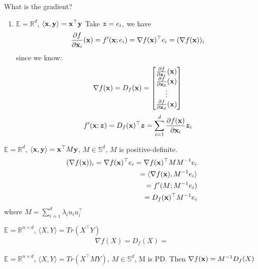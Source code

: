 \documentclass[11pt]{article}
\begin{document}
\begin{remark}
    What is the gradient?
    \begin{enumerate}
        \item $\mathbb{E} = \mathbb{R}^{d}$, $\langle {\mathbf{x}}, {\mathbf{y}} \rangle = {\mathbf{x}}^{\top}{\mathbf{y}}$
        Take ${\bm{z}} = e_{i}$, we have 
        \begin{align*}
            \frac{\partial f}{\partial {\mathbf{x}}_{i}}({\mathbf{x}}) = f'({\mathbf{x}};e_{i}) = \nabla f({\mathbf{x}})^{\top}e_i
                =(\nabla f({\mathbf{x}}))_{i}
        \end{align*}
        since we know:
        \begin{align*}
            \nabla f({\mathbf{x}}) = D_{f}({\mathbf{x}}) = \begin{bmatrix} \frac{\partial f}{\partial {\mathbf{x}}_1}({\mathbf{x}}) \\ 
                \frac{\partial f}{\partial {\mathbf{x}}_2}({\mathbf{x}}) \\ \vdots 
                \\ 
                \frac{\partial f}{\partial {\mathbf{x}}_d}({\mathbf{x}})
             \end{bmatrix}
        \end{align*}
        \begin{align*}
            f'({\mathbf{x}}; {\bm{z}}) = D_{f}({\mathbf{x}})^{\top}{\bm{z}} = \sum_{i=1}^{d}\frac{\partial f({\mathbf{x}})}{\partial {\mathbf{x}}_{i}}{\bm{z}}_{i}
        \end{align*}
    \end{enumerate}
    \item $\mathbb{E} = \mathbb{R}^{d}$, $\langle {\mathbf{x}},{\mathbf{y}} \rangle = {\mathbf{x}}^{\top}M{\mathbf{y}}$, 
    $M \in \mathbb{S}^{d}$, $M$ is positive-definite.
    \begin{align*}
        (\nabla f({\mathbf{x}}))_{i} = \nabla f({\mathbf{x}})^{\top}e_{i} = \nabla f({\mathbf{x}})^{\top}MM^{-1}e_{i}\\
        = \langle \nabla f({\mathbf{x}}), M^{-1}e_{i} \rangle\\
        = f'(M; M^{-1}e_{i}) \\
        = D_{f}({\mathbf{x}})^{\top}M^{-1}e_{i}
    \end{align*}
    where $M = \sum_{i=1}^{d}\lambda_i u_i u_i^{\top}$
    \item $\mathbb{E} = \mathbb{R}^{n \times d}$, $\langle X, Y \rangle = Tr(X^{\top}Y)$
    \begin{align*}
        \nabla f(X) = D_{f}(X) = 
    \end{align*}
    \item $\mathbb{E} = \mathbb{R}^{n \times d}$, $\langle X,Y \rangle = 
    Tr(X^{\top}MY)$, $M \in \mathbb{S}^{d}$, M is PD. Then $\nabla f({\mathbf{x}}) = M^{-1}D_{f}(X)$
\end{remark}
\end{document}

